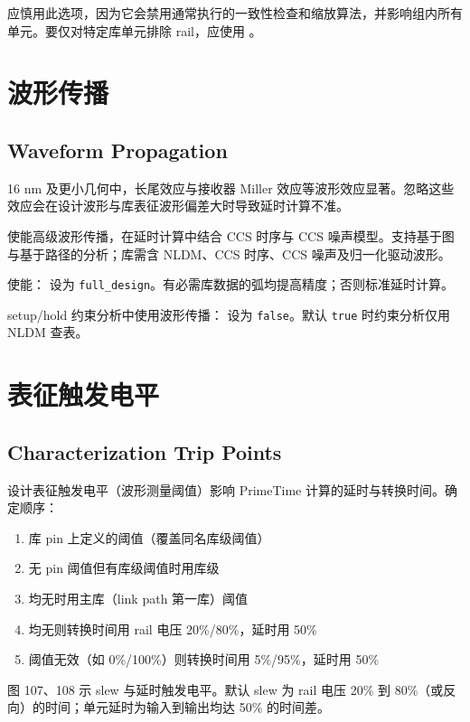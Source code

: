 应慎用此选项，因为它会禁用通常执行的一致性检查和缩放算法，并影响组内所有单元。要仅对特定库单元排除 rail，应使用 。

\section{波形传播}
\subsection*{Waveform Propagation}

16 nm 及更小几何中，长尾效应与接收器 Miller 效应等波形效应显著。忽略这些效应会在设计波形与库表征波形偏差大时导致延时计算不准。

使能高级波形传播，在延时计算中结合 CCS 时序与 CCS 噪声模型。支持基于图与基于路径的分析；库需含 NLDM、CCS 时序、CCS 噪声及归一化驱动波形。

使能： 设为 \texttt{full\_design}。有必需库数据的弧均提高精度；否则标准延时计算。

setup/hold 约束分析中使用波形传播： 设为 \texttt{false}。默认 \texttt{true} 时约束分析仅用 NLDM 查表。

\section{表征触发电平}
\subsection*{Characterization Trip Points}

设计表征触发电平（波形测量阈值）影响 PrimeTime 计算的延时与转换时间。确定顺序：
\begin{enumerate}
  \item 库 pin 上定义的阈值（覆盖同名库级阈值）
  \item 无 pin 阈值但有库级阈值时用库级
  \item 均无时用主库（link path 第一库）阈值
  \item 均无则转换时间用 rail 电压 20\%/80\%，延时用 50\%
  \item 阈值无效（如 0\%/100\%）则转换时间用 5\%/95\%，延时用 50\%
\end{enumerate}

图 107、108 示 slew 与延时触发电平。默认 slew 为 rail 电压 20\% 到 80\%（或反向）的时间；单元延时为输入到输出均达 50\% 的时间差。

